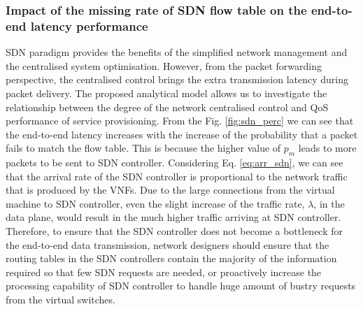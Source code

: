 \subsubsection{Impact of the missing rate of SDN flow table on the end-to-end latency performance}

SDN paradigm provides the benefits of the simplified network management and the centralised system optimisation. However, from the packet forwarding perspective, the centralised control brings the extra transmission latency during packet delivery. The proposed analytical model allows us to investigate the relationship between the degree of the network centralised control and QoS performance of service provisioning. From the Fig. \ref{fig:sdn_perc} we can see that the end-to-end latency increases with the increase of the probability that a packet fails to match the flow table. This is because the higher value of $p_m$ leads to more packets to be sent to SDN controller. Considering Eq. \ref{eq:arr_sdn}, we can see that the arrival rate of the SDN controller is proportional to the network traffic that is produced by the VNFs. Due to the large connections from the virtual machine to SDN controller, even the slight increase of the traffic rate, $\lambda$, in the data plane, would result in the much higher traffic arriving at SDN controller. Therefore, to ensure that the SDN controller does not become a bottleneck for the end-to-end data transmission, network designers should ensure that the routing tables in the SDN controllers contain the majority of the information required so that few SDN requests are needed, or proactively increase the processing capability of SDN controller to handle huge amount of bustry requests from the virtual switches.